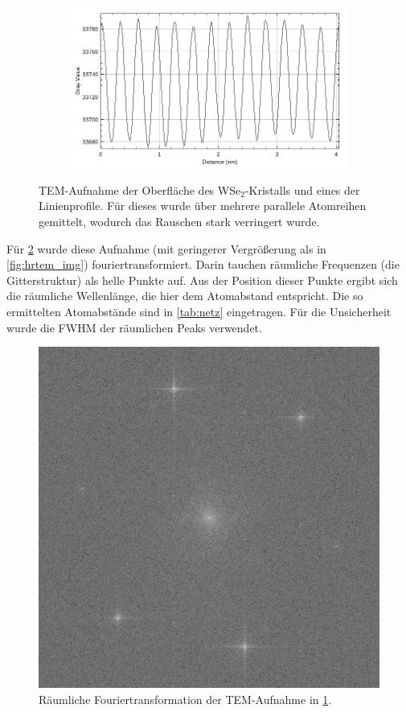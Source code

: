 \begin{figure}[H]
	\begin{subfigure}[b]{0.65\textwidth}
        \centering
				\includegraphics[width= 1 \linewidth]{img/tem_line-Plot_hrtem_orig}
				\caption{}
		\end{subfigure}
		\caption{
      TEM-Aufnahme der Oberfläche des WSe$_2$-Kristalls und eines der Linienprofile. Für dieses wurde über mehrere parallele Atomreihen gemittelt, wodurch das Rauschen stark verringert wurde.
				}
    \label{fig:hrtem}
	\end{figure}

  Für \cref{fig:ft} wurde diese Aufnahme (mit geringerer Vergrößerung als in \cref{fig:hrtem_img}) fouriertransformiert.
  Darin tauchen räumliche Frequenzen (die Gitterstruktur) als helle Punkte auf.
  Aus der Position dieser Punkte ergibt sich die räumliche Wellenlänge, die hier dem Atomabstand entspricht.
  Die so ermittelten Atomabstände sind in \cref{tab:netz} eingetragen.
  Für die Unsicherheit wurde die FWHM der räumlichen Peaks verwendet.

	\begin{figure}[H]
  \centering
			\includegraphics[width= 0.4 \linewidth]{img/tem_hrtem_crop_fft}
			\caption{
        Räumliche Fouriertransformation der TEM-Aufnahme in \cref{fig:hrtem}.
			}
			\label{fig:ft}
	\end{figure}

